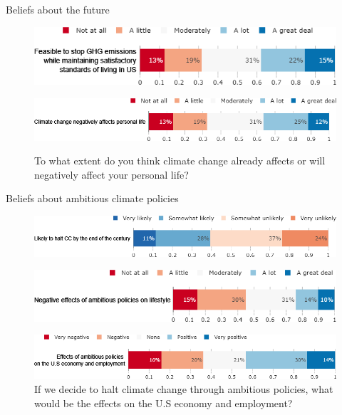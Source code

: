 \documentclass[aspectratio=169,9pt,dvipsnames]{beamer}
\begin{document}
\begin{frame}{Beliefs about the future}%
\begin{figure}[h!]
\caption{To what extent do you think that it is technically feasible to stop greenhouse gas emissions while maintaining satisfactory standards of living in the U.S.?}
\includegraphics[width=.6\textwidth]{../figures/US/net_zero_feasible_US.png} \\
\caption{To what extent do you think climate change already affects or will negatively affect your personal life?}
\includegraphics[width=.7\textwidth]{../figures/US/CC_affects_self_US.png} \\
\end{figure}
\end{frame}

\begin{frame}{Beliefs about ambitious climate policies}%
\begin{figure}[h!]
\centering
\caption{How likely is it that human kind halt climate change by the end of the century?}
\includegraphics[width=.7\textwidth]{../figures/US/CC_will_end_US.png}\\
\caption{If we decide to halt climate change through ambitious policies, to what extent do you think it would negatively affect your lifestyle?}
\includegraphics[width=.7\textwidth]{../figures/US/effect_halt_CC_lifestyle_US.png} \\
\caption{If we decide to halt climate change through ambitious policies, what would be the effects on the U.S economy and employment?}
\includegraphics[width=.7\textwidth]{../figures/US/effect_halt_CC_economy_US.png}
\end{figure}
\end{frame}
\end{document}
